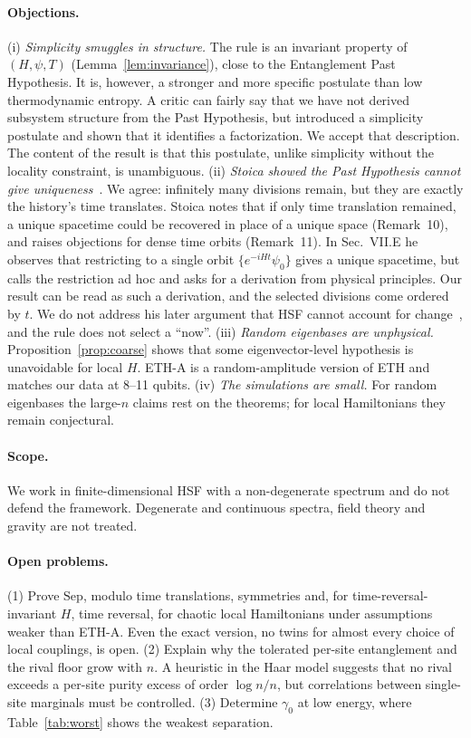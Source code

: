 \documentclass[11pt]{article}
\theoremstyle{definition}
\theoremstyle{remark}
\begin{document}
\paragraph{Objections.} (i) \emph{Simplicity smuggles in structure.} The rule is an invariant property of $(H,\psi,T)$ (Lemma~\ref{lem:invariance}), close to the Entanglement Past Hypothesis. It is, however, a stronger and more specific postulate than low thermodynamic entropy. A critic can fairly say that we have not derived subsystem structure from the Past Hypothesis, but introduced a simplicity postulate and shown that it identifies a factorization. We accept that description. The content of the result is that this postulate, unlike simplicity without the locality constraint, is unambiguous. (ii) \emph{Stoica showed the Past Hypothesis cannot give uniqueness}~\cite[Sec.~VII.B]{Stoica2022}. We agree: infinitely many divisions remain, but they are exactly the history's time translates. Stoica notes that if only time translation remained, a unique spacetime could be recovered in place of a unique space (Remark~10), and raises objections for dense time orbits (Remark~11). In Sec.~VII.E he observes that restricting to a single orbit $\{e^{-iHt}\psi_0\}$ gives a unique spacetime, but calls the restriction ad hoc and asks for a derivation from physical principles. Our result can be read as such a derivation, and the selected divisions come ordered by $t$. We do not address his later argument that HSF cannot account for change~\cite{Stoica2026}, and the rule does not select a ``now''. (iii) \emph{Random eigenbases are unphysical.} Proposition~\ref{prop:coarse} shows that some eigenvector-level hypothesis is unavoidable for local $H$. ETH-A is a random-amplitude version of ETH and matches our data at 8--11 qubits. (iv) \emph{The simulations are small.} For random eigenbases the large-$n$ claims rest on the theorems; for local Hamiltonians they remain conjectural.

\paragraph{Scope.} We work in finite-dimensional HSF with a non-degenerate spectrum and do not defend the framework. Degenerate and continuous spectra, field theory and gravity are not treated.

\paragraph{Open problems.} (1) Prove $\mathrm{Sep}$, modulo time translations, symmetries and, for time-reversal-invariant $H$, time reversal, for chaotic local Hamiltonians under assumptions weaker than ETH-A. Even the exact version, no twins for almost every choice of local couplings, is open. (2) Explain why the tolerated per-site entanglement and the rival floor grow with $n$. A heuristic in the Haar model suggests that no rival exceeds a per-site purity excess of order $\log n/n$, but correlations between single-site marginals must be controlled. (3) Determine $\gamma_0$ at low energy, where Table~\ref{tab:worst} shows the weakest separation.
\end{document}
